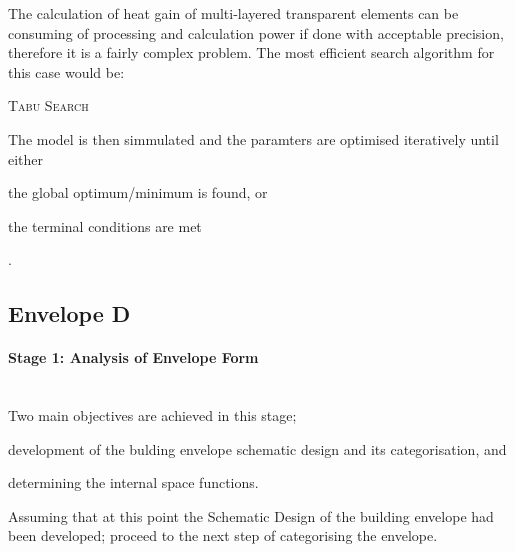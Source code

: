 The calculation of heat gain of multi-layered transparent elements can be consuming of processing and calculation power if done with acceptable precision, therefore it is a fairly complex problem. The most efficient search algorithm for this case would be:

\begin{compactenum}
\item \textsc{Tabu Search}
\end{compactenum}

The model is then simmulated and the paramters are optimised iteratively until either \begin{inparaenum}[a)]\item the global optimum/minimum is found, or \item the terminal conditions are met\end{inparaenum}.


\clearpage
\subsection{Envelope D}

\paragraph{Stage 1: Analysis of Envelope Form}\mbox{}\\[2mm]

Two main objectives are achieved in this stage; \begin{inparaenum}[a)] \item development of the bulding envelope schematic design and its categorisation, and \item determining the internal space functions.\end{inparaenum}

Assuming that at this point the Schematic Design of the building envelope had been developed; proceed to the next step of categorising the envelope.

